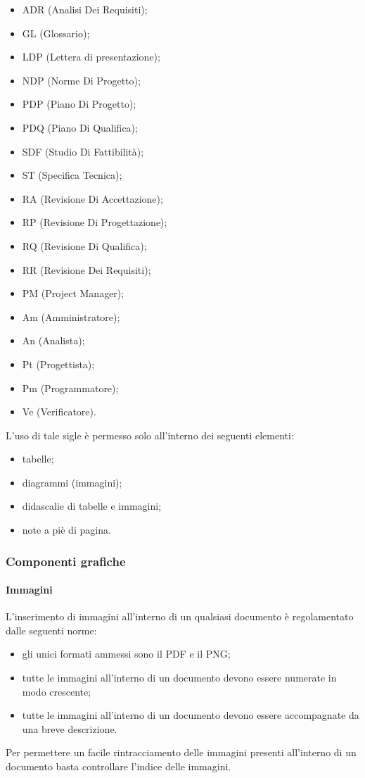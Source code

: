 					\begin{itemize}
						\item ADR (Analisi Dei Requisiti);
						\item GL (Glossario);
						\item LDP (Lettera di presentazione);
						\item NDP (Norme Di Progetto);
						\item PDP (Piano Di Progetto);
						\item PDQ (Piano Di Qualifica);
						\item SDF (Studio Di Fattibilità);
						\item ST (Specifica Tecnica);
						\item RA (Revisione Di Accettazione);
						\item RP (Revisione Di Progettazione);
						\item RQ (Revisione Di Qualifica);
						\item RR (Revisione Dei Requisiti);
						\item PM (Project Manager);
						\item Am (Amministratore);
						\item An (Analista);
						\item Pt (Progettista);
						\item Pm (Programmatore);
						\item Ve (Verificatore).
					\end{itemize}
					L’uso di tale sigle è permesso solo all’interno dei seguenti elementi:
					\begin{itemize}
						\item tabelle;
						\item diagrammi (immagini);
						\item didascalie di tabelle e immagini;
						\item note a piè di pagina.
					\end{itemize}
		\subsubsection{Componenti grafiche}
			\paragraph{Immagini}
				L’inserimento di immagini all’interno di un qualsiasi documento è regolamentato dalle seguenti norme:
				\begin{itemize}
					\item gli unici formati ammessi sono il PDF e il PNG;
					\item tutte le immagini all’interno di un documento devono essere numerate in modo crescente;
					\item tutte le immagini all’interno di un documento devono essere accompagnate da una breve descrizione.
				\end{itemize}
				Per permettere un facile rintracciamento delle immagini presenti all’interno di un documento basta controllare l’indice delle immagini.
